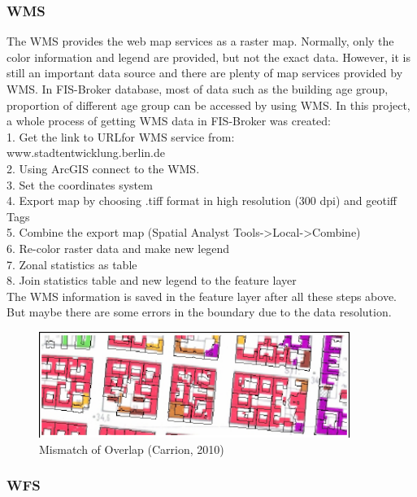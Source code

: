 \subsubsection{WMS}

The WMS provides the web map services as a raster map. Normally, only the color information and legend are provided, but not the exact data. However, it is still an important data source and there are plenty of map services provided by WMS. In FIS-Broker database, most of data such as the building age group, proportion of different age group can be accessed by using WMS. 
In this project, a whole process of getting WMS data in FIS-Broker was created: \\
1. Get the link to URLfor WMS service from:\\
www.stadtentwicklung.berlin.de\\
2. Using ArcGIS connect to the WMS.\\
3. Set the coordinates system\\
4. Export map by choosing .tiff format in high resolution (300 dpi) and geotiff Tags\\
5. Combine the export map (Spatial Analyst Tools->Local->Combine)\\
6. Re-color raster data and make new legend\\
7. Zonal statistics as table\\
8. Join statistics table and new legend to the feature layer\\

The WMS information is saved in the feature layer after all these steps above. But maybe there are some errors in the boundary due to the data resolution. \\
\begin{figure}[ht]
	\centering
	\includegraphics[width=0.9\textwidth]{phase1/group3/fig2.png}
	\caption{Mismatch of Overlap (Carrion, 2010)}
	\label{fig:figure2}
\end{figure}
\subsubsection{WFS}

